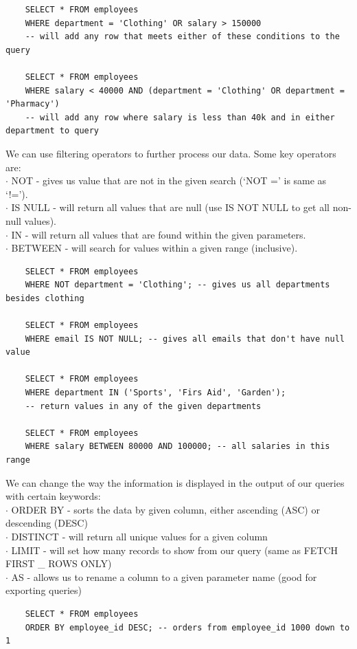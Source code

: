 \documentclass[11pt, a4paper]{article}
\begin{document}
\begin{spacing}{1.1}
\begin{lstlisting}
	SELECT * FROM employees
	WHERE department = 'Clothing' OR salary > 150000
	-- will add any row that meets either of these conditions to the query 
	
	SELECT * FROM employees
	WHERE salary < 40000 AND (department = 'Clothing' OR department = 'Pharmacy') 
	-- will add any row where salary is less than 40k and in either department to query \end{lstlisting} \vspace*{1mm}
	We can use filtering operators to further process our data. Some key operators are: \\
	\hspace*{3mm} $\cdot$ NOT - gives us value that are not in the given search (`NOT =' is same as `!='). \\
	\hspace*{3mm} $\cdot$ IS NULL - will return all values that are null (use IS NOT NULL to get all non-null values).\\
	\hspace*{3mm} $\cdot$ IN - will return all values that are found within the given parameters.\\
	\hspace*{3mm} $\cdot$ BETWEEN - will search for values within a given range (inclusive).
	\begin{lstlisting}
	SELECT * FROM employees
	WHERE NOT department = 'Clothing'; -- gives us all departments besides clothing
	
	SELECT * FROM employees
	WHERE email IS NOT NULL; -- gives all emails that don't have null value
	
	SELECT * FROM employees
	WHERE department IN ('Sports', 'Firs Aid', 'Garden'); 
	-- return values in any of the given departments
	
	SELECT * FROM employees
	WHERE salary BETWEEN 80000 AND 100000; -- all salaries in this range \end{lstlisting} \newpage
	\noindent We can change the way the information is displayed in the output of our queries with certain keywords: \\
	\hspace*{3mm} $\cdot$ ORDER BY - sorts the data by given column, either ascending (ASC) or descending (DESC) \\
	\hspace*{3mm} $\cdot$ DISTINCT - will return all unique values for a given column \\
	\hspace*{3mm} $\cdot$ LIMIT - will set how many records to show from our query (same as FETCH FIRST \_ ROWS ONLY)\\
	\hspace*{3mm} $\cdot$ AS - allows us to rename a column to a given parameter name (good for exporting queries)
	\begin{lstlisting}
	SELECT * FROM employees
	ORDER BY employee_id DESC; -- orders from employee_id 1000 down to 1
	

\end{lstlisting}
\end{spacing}
\end{document}
